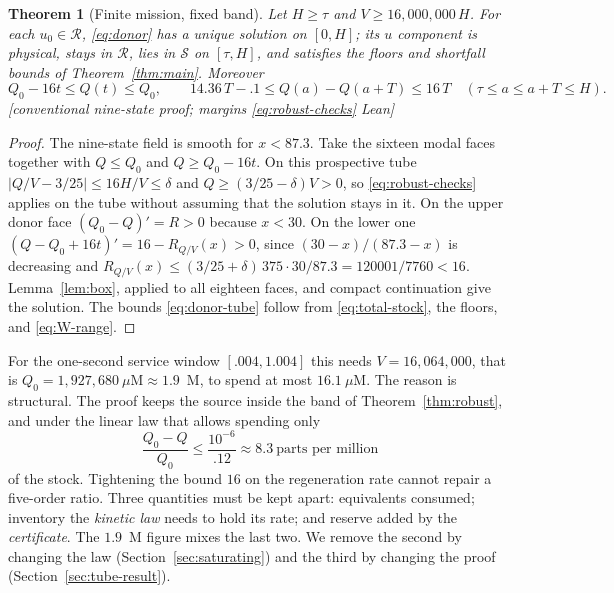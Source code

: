 \documentclass[11pt,a4paper]{article}
\theoremstyle{plain}
\newtheorem{theorem}{Theorem}[section]
\theoremstyle{definition}
\theoremstyle{remark}
\newcommand{\uM}{\ensuremath{\mu\mathrm{M}}}
\newcommand{\RR}{\mathcal R}
\newcommand{\SSS}{\mathcal S}
\newcommand{\evid}[1]{\textnormal{\textsf{\small[#1]}}}
\begin{document}
\begin{theorem}[Finite mission, fixed band]\label{thm:donor}
Let $H\ge\tau$ and $V\ge16{,}000{,}000\,H$. For each $u_0\in\RR$,
\eqref{eq:donor} has a unique solution on $[0,H]$; its $u$ component is
physical, stays in $\RR$, lies in $\SSS$ on $[\tau,H]$, and satisfies the
floors and shortfall bounds of Theorem~\ref{thm:main}. Moreover
\begin{equation}\label{eq:donor-tube}
Q_0-16t\le Q(t)\le Q_0,\qquad
14.36\,T-.1\le Q(a)-Q(a+T)\le16\,T\quad(\tau\le a\le a+T\le H).
\end{equation}
\evid{conventional nine-state proof; margins \eqref{eq:robust-checks} Lean}
\end{theorem}
\begin{proof}
The nine-state field is smooth for $x<87.3$. Take the sixteen modal faces
together with $Q\le Q_0$ and $Q\ge Q_0-16t$. On this prospective tube
$|Q/V-3/25|\le16H/V\le\delta$ and $Q\ge(3/25-\delta)V>0$, so
\eqref{eq:robust-checks} applies on the tube without assuming that the
solution stays in it. On the upper donor face $(Q_0-Q)'=R>0$ because $x<30$.
On the lower one $(Q-Q_0+16t)'=16-R_{Q/V}(x)>0$, since $(30-x)/(87.3-x)$ is
decreasing and
$R_{Q/V}(x)\le(3/25+\delta)\,375\cdot30/87.3=120001/7760<16$.
Lemma~\ref{lem:box}, applied to all eighteen faces, and compact continuation
give the solution. The bounds \eqref{eq:donor-tube} follow from
\eqref{eq:total-stock}, the floors, and \eqref{eq:W-range}.
\end{proof}

For the one-second service window $[.004,1.004]$ this needs
$V=16{,}064{,}000$, that is $Q_0=1{,}927{,}680~\uM\approx1.9$~M, to spend at
most $16.1~\uM$. The reason is structural. The proof keeps the source inside
the band of Theorem~\ref{thm:robust}, and under the linear law that allows
spending only
\begin{equation}\label{eq:ppm}
\frac{Q_0-Q}{Q_0}\le\frac{10^{-6}}{.12}\approx8.3\ \text{parts per million}
\end{equation}
of the stock. Tightening the bound $16$ on the regeneration rate cannot repair
a five-order ratio. Three quantities must be kept apart: equivalents consumed;
inventory the \emph{kinetic law} needs to hold its rate; and reserve added by
the \emph{certificate}. The $1.9$~M figure mixes the last two. We remove the
second by changing the law (Section~\ref{sec:saturating}) and the third by
changing the proof (Section~\ref{sec:tube-result}).
\end{document}
